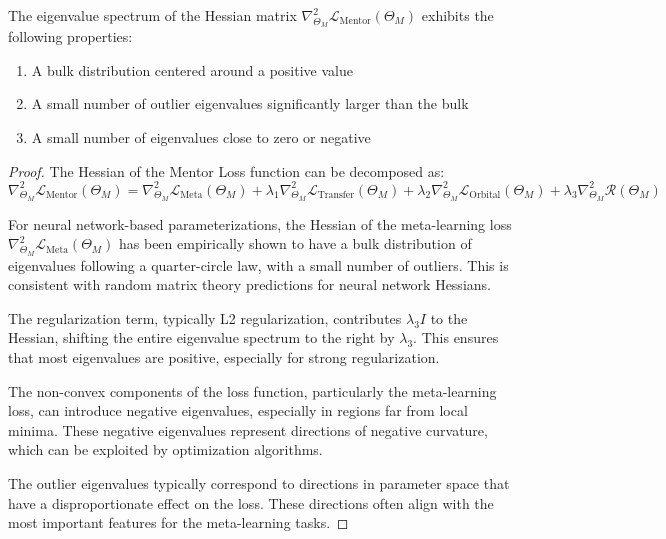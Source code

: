 \begin{theorem}
The eigenvalue spectrum of the Hessian matrix $\nabla^2_{\Theta_M} \mathcal{L}_{\text{Mentor}}(\Theta_M)$ exhibits the following properties:
\begin{enumerate}
    \item A bulk distribution centered around a positive value
    \item A small number of outlier eigenvalues significantly larger than the bulk
    \item A small number of eigenvalues close to zero or negative
\end{enumerate}
\end{theorem}

\begin{proof}
The Hessian of the Mentor Loss function can be decomposed as:
\begin{equation}
\nabla^2_{\Theta_M} \mathcal{L}_{\text{Mentor}}(\Theta_M) = \nabla^2_{\Theta_M} \mathcal{L}_{\text{Meta}}(\Theta_M) + \lambda_1 \nabla^2_{\Theta_M} \mathcal{L}_{\text{Transfer}}(\Theta_M) + \lambda_2 \nabla^2_{\Theta_M} \mathcal{L}_{\text{Orbital}}(\Theta_M) + \lambda_3 \nabla^2_{\Theta_M} \mathcal{R}(\Theta_M)
\end{equation}

For neural network-based parameterizations, the Hessian of the meta-learning loss $\nabla^2_{\Theta_M} \mathcal{L}_{\text{Meta}}(\Theta_M)$ has been empirically shown to have a bulk distribution of eigenvalues following a quarter-circle law, with a small number of outliers. This is consistent with random matrix theory predictions for neural network Hessians.

The regularization term, typically L2 regularization, contributes $\lambda_3 I$ to the Hessian, shifting the entire eigenvalue spectrum to the right by $\lambda_3$. This ensures that most eigenvalues are positive, especially for strong regularization.

The non-convex components of the loss function, particularly the meta-learning loss, can introduce negative eigenvalues, especially in regions far from local minima. These negative eigenvalues represent directions of negative curvature, which can be exploited by optimization algorithms.

The outlier eigenvalues typically correspond to directions in parameter space that have a disproportionate effect on the loss. These directions often align with the most important features for the meta-learning tasks.
\end{proof}

